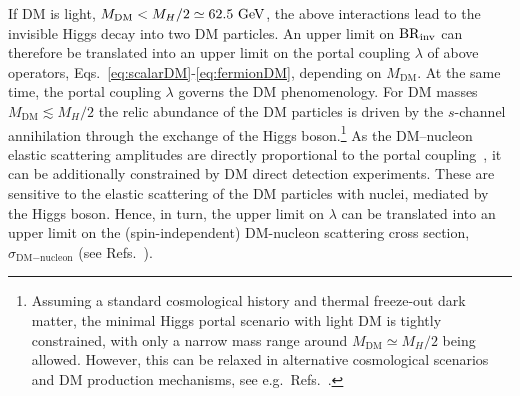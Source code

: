 \documentclass[../report.tex]{subfiles}
\begin{document}
If DM is light, $M_\text{DM} < M_H /2 \simeq 62.5~\text{GeV}$, the above interactions lead to the invisible Higgs decay into two DM particles. An upper limit on $\mathrm{BR}_\mathrm{inv}$ can therefore be translated into an upper limit on the portal coupling $\lambda$ of above operators, Eqs.~\eqref{eq:scalarDM}-\eqref{eq:fermionDM}, depending on $M_\text{DM}$.  At the same time, the portal coupling $\lambda$ governs the DM phenomenology. For DM masses $M_\text{DM} \lesssim M_H/2$ the relic abundance of the DM particles is driven by the $s$-channel annihilation through the exchange of the Higgs boson.\footnote{Assuming a standard cosmological history and thermal freeze-out dark matter, the minimal Higgs portal scenario with light DM is tightly constrained, with only a narrow mass range around $M_\text{DM} \simeq M_H/2$ being  allowed. However, this can be relaxed in alternative cosmological scenarios and DM production mechanisms, see e.g.~Refs.~\cite{Hardy:2018bph,Bernal:2018ins,Bernal:2018kcw}.} As the DM--nucleon elastic scattering amplitudes are directly proportional to the portal coupling~\cite{Kanemura:2010sh}, it can be additionally constrained by DM direct detection experiments.  These are sensitive to the elastic scattering of the DM particles with nuclei, mediated by the Higgs boson. Hence, in turn, the upper limit on $\lambda$ can be translated into an upper limit on the (spin-independent) DM-nucleon scattering cross section, $\sigma_{\text{DM}-\text{nucleon}}$ (see Refs.~\cite{Kanemura:2010sh,Djouadi:2011aa}).
\end{document}

